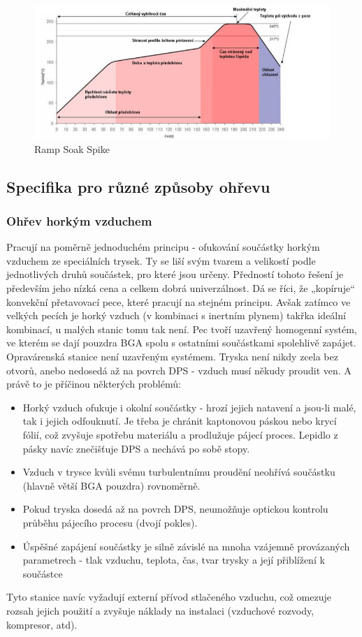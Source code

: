 \begin{figure}[h]
   \begin{center}
     \includegraphics[scale=0.6]{images/RSS.png}
   \end{center}
   \caption{Ramp Soak Spike}
\end{figure}

\pagebreak
\subsection{Specifika pro různé způsoby ohřevu}

\subsubsection{Ohřev horkým vzduchem}
Pracují na poměrně jednoduchém principu - ofukování součástky horkým vzduchem ze speciálních trysek. Ty se liší svým tvarem a velikostí podle jednotlivých druhů součástek, pro které jsou určeny. Předností tohoto řešení je především jeho nízká cena a celkem dobrá univerzálnost. Dá se říci, že „kopíruje“ konvekční přetavovací pece, které pracují na stejném principu. Avšak zatímco ve velkých pecích je horký vzduch (v kombinaci s inertním plynem) takřka ideální kombinací, u malých stanic tomu tak není. Pec tvoří uzavřený homogenní systém, ve kterém se dají pouzdra BGA spolu s ostatními součástkami spolehlivě zapájet. Opravárenská stanice není uzavřeným systémem. Tryska není nikdy zcela bez otvorů, anebo nedosedá až na povrch DPS - vzduch musí někudy
proudit ven. A právě to je příčinou některých problémů:
\begin{itemize}
\item Horký vzduch ofukuje i okolní součástky - hrozí jejich natavení a jsou-li malé, tak i jejich odfouknutí. Je třeba je chránit kaptonovou páskou nebo krycí fólií, což zvyšuje spotřebu materiálu a prodlužuje pájecí proces. Lepidlo z pásky navíc znečišťuje DPS  a nechává po sobě stopy.
\item  Vzduch v trysce kvůli svému turbulentnímu proudění neohřívá součástku (hlavně větší BGA pouzdra) rovnoměrně.
\item  Pokud tryska dosedá až na povrch DPS, neumožňuje optickou kontrolu průběhu pájecího procesu (dvojí pokles).
\item  Úspěšné zapájení součástky je silně závislé na mnoha vzájemně provázaných
parametrech - tlak vzduchu, teplota, čas, tvar trysky a její přiblížení k součástce
\end{itemize}
Tyto stanice navíc vyžadují externí přívod stlačeného vzduchu, což omezuje rozsah jejich
použití a zvyšuje náklady na instalaci (vzduchové rozvody, kompresor, atd).

